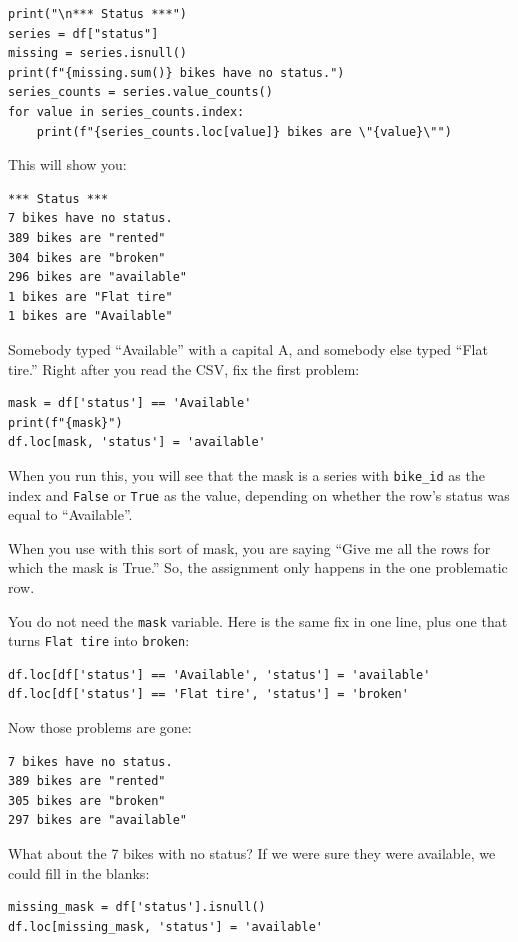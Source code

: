 \begin{verbatim}
print("\n*** Status ***")
series = df["status"]
missing = series.isnull()
print(f"{missing.sum()} bikes have no status.")
series_counts = series.value_counts()
for value in series_counts.index:
    print(f"{series_counts.loc[value]} bikes are \"{value}\"")
\end{verbatim}

This will show you:

\begin{verbatim}
*** Status ***
7 bikes have no status.
389 bikes are "rented"
304 bikes are "broken"
296 bikes are "available"
1 bikes are "Flat tire"
1 bikes are "Available"
\end{verbatim}

Somebody typed ``Available'' with a capital A, and somebody else typed
``Flat tire.'' Right after you read the CSV, fix the first problem:

\begin{verbatim}
mask = df['status'] == 'Available'
print(f"{mask}")
df.loc[mask, 'status'] = 'available'
\end{verbatim}

When you run this, you will see that the mask is a series with
\texttt{bike\_id} as the index and \texttt{False} or \texttt{True} as the value,
depending on whether the row's status was equal to ``Available''.

When you use  with this sort of mask, you are saying
``Give me all the rows for which the mask is True.''  So, the
assignment only happens in the one problematic row.

You do not need the \texttt{mask} variable. Here is the same fix in one
line, plus one that turns \texttt{Flat tire} into \texttt{broken}:

\begin{verbatim}
df.loc[df['status'] == 'Available', 'status'] = 'available'
df.loc[df['status'] == 'Flat tire', 'status'] = 'broken'
\end{verbatim}

Now those problems are gone:
\begin{verbatim}
7 bikes have no status.
389 bikes are "rented"
305 bikes are "broken"
297 bikes are "available"
\end{verbatim}

What about the 7 bikes with no status? If we were sure they were
available, we could fill in the blanks:

\begin{verbatim}
missing_mask = df['status'].isnull()
df.loc[missing_mask, 'status'] = 'available'
\end{verbatim}

